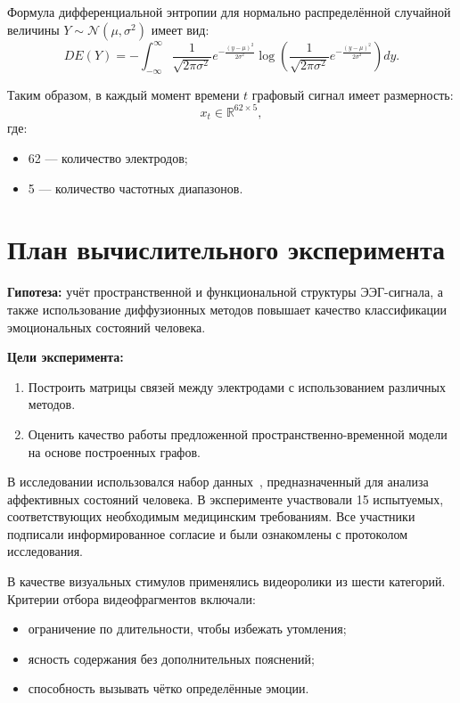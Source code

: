 \documentclass[12pt, twoside]{article}
\begin{document}
Формула дифференциальной энтропии для нормально распределённой случайной величины $Y \sim \mathcal{N}(\mu, \sigma^2)$ имеет вид:
\begin{equation}
DE(Y) = -\int_{-\infty}^{\infty} \frac{1}{\sqrt{2\pi\sigma^2}} e^{-\frac{(y - \mu)^2}{2\sigma^2}} \log \left( \frac{1}{\sqrt{2\pi\sigma^2}} e^{-\frac{(y - \mu)^2}{2\sigma^2}} \right) dy.
\end{equation}

Таким образом, в каждый момент времени $t$ графовый сигнал имеет размерность:
\[
x_t \in \mathbb{R}^{62 \times 5},
\]
где:
\begin{itemize}
    \item 62 — количество электродов;
    \item 5 — количество частотных диапазонов.
\end{itemize}

\section{План вычислительного эксперимента}

\textbf{Гипотеза:} учёт пространственной и функциональной структуры ЭЭГ-сигнала, а также использование диффузионных методов повышает качество классификации эмоциональных состояний человека.

\textbf{Цели эксперимента:}
\begin{enumerate}
    \item Построить матрицы связей между электродами с использованием различных методов.
    \item Оценить качество работы предложенной пространственно-временной модели на основе построенных графов.
\end{enumerate}

В исследовании использовался набор данных~\cite{Dataset}, предназначенный для анализа аффективных состояний человека. В эксперименте участвовали 15 испытуемых, соответствующих необходимым медицинским требованиям. Все участники подписали информированное согласие и были ознакомлены с протоколом исследования.

В качестве визуальных стимулов применялись видеоролики из шести категорий. Критерии отбора видеофрагментов включали:
\begin{itemize}
    \item ограничение по длительности, чтобы избежать утомления;
    \item ясность содержания без дополнительных пояснений;
    \item способность вызывать чётко определённые эмоции.
\end{itemize}
\end{document}
